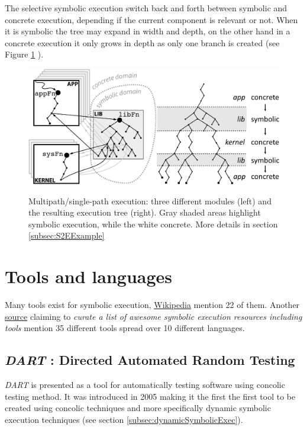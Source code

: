 \documentclass[11pt]{IEEEtran}
\begin{document}
    		The selective symbolic execution switch back and forth between symbolic and concrete execution, depending if the current component is relevant or not. When it is symbolic the tree may expand in width and depth, on the other hand in a concrete execution it only grows in depth as only one branch is created (see Figure \ref{fig:selectiveSymbolicExample} ).
    		\begin{figure}
    			\centering
    			\includegraphics[scale=0.9]{selectiveSymbolicExecExample.png}
    			\label{fig:selectiveSymbolicExample}
    			\caption{Multipath/single-path execution: three different modules (left) and the resulting execution tree (right). Gray shaded areas highlight symbolic execution, while the white concrete. More details in section \ref{subsec:S2EExample}}
    		\end{figure}



  \section{Tools and languages}
  	Many tools exist for symbolic execution, \href{https://en.wikipedia.org/wiki/Symbolic_execution\#Tools}{Wikipedia} mention 22 of them. Another \href{https://github.com/ksluckow/awesome-symbolic-execution\#tools}{source} claiming to \emph{curate a list of awesome symbolic execution resources including tools} mention 35 different tools spread over 10 different languages.\\ %



    \subsection{\emph{DART} : Directed Automated Random Testing}
    \label{subsec:DART}
    	\emph{DART} is presented as a tool for automatically testing software using concolic testing method. It was introduced in 2005 making it the first the first tool to be created using concolic techniques and more specifically dynamic symbolic execution techniques (see section \ref{subsec:dynamicSymbolicExec}). \\
\end{document}

